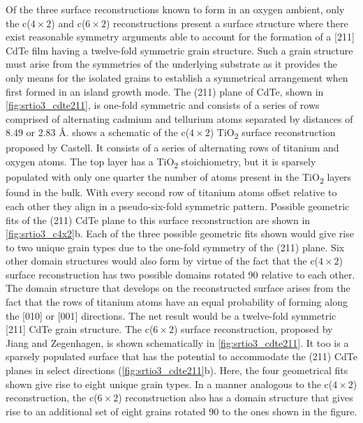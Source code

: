 Of the three surface reconstructions known to form in an oxygen ambient, only the c(\(4\times2\)) and c(\(6\times2\)) reconstructions present a surface structure where there exist reasonable symmetry arguments able to account for the formation of a [211] CdTe film having a twelve-fold symmetric grain structure.
Such a grain structure must arise from the symmetries of the underlying substrate as it provides the only means for the isolated grains to establish a symmetrical arrangement when first formed in an island growth mode.
The (211) plane of CdTe, shown in \cref{fig:srtio3_cdte211}, is one-fold symmetric and consists of a series of rows comprised of alternating cadmium and tellurium atoms separated by distances of 8.49 or 2.83 \AA.  shows a schematic of the c(\(4\times2\)) TiO\textsubscript{2} surface reconstruction proposed by Castell\cite{Castell2002}.
It consists of a series of alternating rows of titanium and oxygen atoms.
The top layer has a TiO\textsubscript{2} stoichiometry, but it is sparsely populated with only one quarter the number of atoms present in the TiO\textsubscript{2} layers found in the bulk\cite{Castell2002}.
With every second row of titanium atoms offset relative to each other they align in a pseudo-six-fold symmetric pattern.
Possible geometric fits of the (211) CdTe plane to this surface reconstruction are shown in \cref{fig:srtio3_c4x2}b.
Each of the three possible geometric fits shown would give rise to two unique grain types due to the one-fold symmetry of the (211) plane.
Six other domain structures would also form by virtue of the fact that the c(\(4\times2\)) surface reconstruction has two possible domains rotated 90\degree{} relative to each other\cite{Castell2002}.
The domain structure that develops on the reconstructed surface arises from the fact that the rows of titanium atoms have an equal probability of forming along the [010] or [001] directions.
The net result would be a twelve-fold symmetric [211] CdTe grain structure.
The c(\(6\times2\)) surface reconstruction, proposed by Jiang and Zegenhagen\cite{Jiang1996}, is shown schematically in \cref{fig:srtio3_cdte211}.
It too is a sparsely populated surface that has the potential to accommodate the (211) CdTe planes in select directions (\cref{fig:srtio3_cdte211}b).
Here, the four geometrical fits shown give rise to eight unique grain types.
In a manner analogous to the c(\(4\times2\)) reconstruction, the c(\(6\times2\)) reconstruction also has a domain structure that gives rise to an additional set of eight grains rotated 90\degree{} to the ones shown in the figure.
